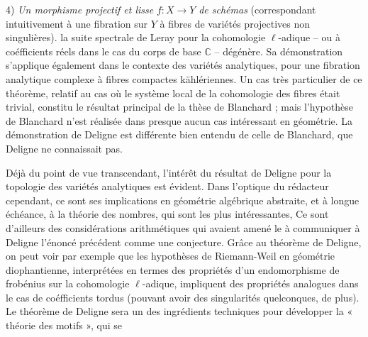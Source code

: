 \documentclass[11pt,a4paper]{article}
\begin{document}
4)  \emph{Un morphisme projectif et lisse} $f\colon X \to Y$ \emph{de schémas} (correspondant intuitivement à une fibration sur $Y$ à fibres de variétés projectives non singulières).   la suite spectrale de Leray pour la cohomologie $\ell$-adique -- ou à coéfficients réels dans le cas du corps de base $\mathbb{C}$ -- dégénère. \struck{\ill{}}  Sa démonstration s'applique également \struck{\ill{}} dans le contexte des variétés analytiques, pour une fibration analytique complexe à fibres compactes kählériennes. Un cas très particulier de ce théorème, relatif au cas où le système local de la cohomologie des fibres était trivial, constitu le résultat principal de la thèse de Blanchard ; mais l'hypothèse de Blanchard n'est réalisée dans presque aucun cas intéressant en géométrie. La démonstration de Deligne est différente bien entendu de celle de Blanchard, que Deligne ne connaissait pas.

Déjà du point de vue transcendant, l'intérêt du résultat de Deligne pour la topologie des variétés analytiques est évident. Dans l'optique du rédacteur cependant, ce sont ses implications en géométrie algébrique abstraite, et à longue échéance, à la théorie des nombres, qui sont les plus intéressantes,   Ce sont d'ailleurs des considérations arithmétiques qui avaient amené le   à communiquer à Deligne  l'énoncé précédent comme une conjecture. Grâce au théorème de Deligne, on peut voir par exemple que les hypothèses de Riemann-Weil en géométrie diophantienne, interprétées en termes des propriétés d'un endomorphisme de frobénius sur la cohomologie $\ell$-adique,  impliquent des propriétés analogues dans le cas de coéfficients tordus (pouvant avoir des singularités quelconques, de plus). Le théorème de Deligne sera un des  ingrédients techniques   pour développer la « théorie des motifs », qui se\ill{}
\end{document}
